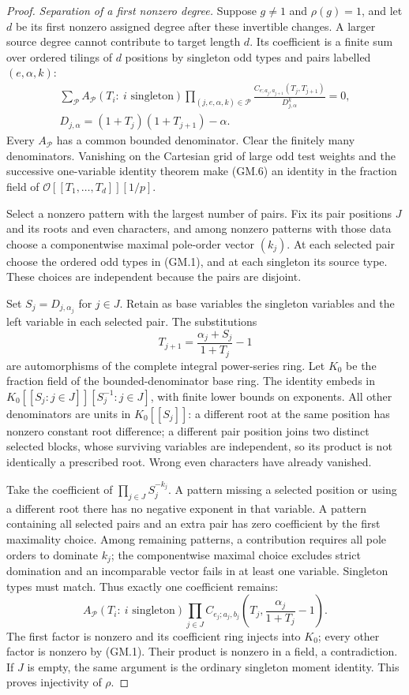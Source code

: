 \begin{proof}
\emph{Separation of a first nonzero degree.}
Suppose $g\ne1$ and $\rho(g)=1$, and let $d$ be its first nonzero
assigned degree after these invertible changes. A larger source
degree cannot contribute to target length $d$. Its coefficient is
a finite sum over ordered tilings of $d$ positions by singleton
odd types and pairs labelled $(e,\alpha,k)$:
\[
 \begin{gathered}
 \sum_{\mathcal P}A_{\mathcal P}(T_i:\ i\text{ singleton})
       \prod_{(j,e,\alpha,k)\in\mathcal P}
       \frac{C_{e;a_j,a_{j+1}}(T_j,T_{j+1})}
            {D_{j,\alpha}^{k}}=0,\\
 D_{j,\alpha}=(1+T_j)(1+T_{j+1})-\alpha.
 \end{gathered}                                            \tag{GM.6}
\]
Every $A_{\mathcal P}$ has a common bounded denominator. Clear
the finitely many denominators. Vanishing on the Cartesian grid
of large odd test weights and the successive one-variable identity
theorem make (GM.6) an identity in the fraction field of
$\mathcal O[[T_1,\ldots,T_d]][1/p]$.

Select a nonzero pattern with the largest number of pairs. Fix its
pair positions $J$ and its roots and even characters, and among
nonzero patterns with those data choose a componentwise maximal
pole-order vector $(k_j)$. At each selected pair choose the ordered
odd types in (GM.1), and at each singleton its source type. These
choices are independent because the pairs are disjoint.

Set $S_j=D_{j,\alpha_j}$ for $j\in J$. Retain as base variables
the singleton variables and the left variable in each selected pair.
The substitutions
\[
 T_{j+1}=\frac{\alpha_j+S_j}{1+T_j}-1
\]
are automorphisms of the complete integral power-series ring.
Let $K_0$ be the fraction field of the bounded-denominator base
ring. The identity embeds in $K_0[[S_j:j\in J]][S_j^{-1}:j\in J]$,
with finite lower bounds on exponents. All other denominators are
units in $K_0[[S_j]]$: a different root at the same position has
nonzero constant root difference; a different pair position joins
two distinct selected blocks, whose surviving variables are
independent, so its product is not identically a prescribed root.
Wrong even characters have already vanished.

Take the coefficient of $\prod_{j\in J}S_j^{-k_j}$.
A pattern missing a selected position or using a different root
there has no negative exponent in that variable. A pattern
containing all selected pairs and an extra pair has zero coefficient
by the first maximality choice. Among remaining patterns, a
contribution requires all pole orders to dominate $k_j$; the
componentwise maximal choice excludes strict domination and an
incomparable vector fails in at least one variable. Singleton types
must match. Thus exactly one coefficient remains:
\[
 A_{\mathcal P}(T_i:\ i\text{ singleton})
 \prod_{j\in J}
 C_{e_j;a_j,b_j}\left(T_j,\frac{\alpha_j}{1+T_j}-1\right).
\]
The first factor is nonzero and its coefficient ring injects into
$K_0$; every other factor is nonzero by (GM.1). Their product is
nonzero in a field, a contradiction. If $J$ is empty, the same
argument is the ordinary singleton moment identity. This proves
injectivity of $\rho$.
\end{proof}

